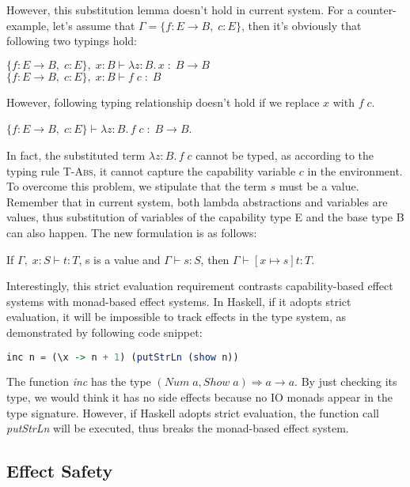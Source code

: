 However, this substitution lemma doesn't hold in current system. For a
counter-example, let's assume that $\Gamma = \{f: E \to B,\;
  c:E\}$, then it's obviously that following two typings hold:


$\{f: E \to B,\; c:E\},\; x:B \vdash \lambda z:B.\,x \; : \; B \to
  B$ \\
$\{f: E \to B,\; c:E\},\; x:B \vdash f \; c \; : \; B$

However, following typing relationship doesn't hold if we replace
$x$ with $f \; c$.

$\{f: E \to B,\; c:E\} \vdash \lambda z:B.\,f \; c \; : \; B \to B$.

In fact, the substituted term $\lambda z:B.\,f \; c$ cannot be typed,
as according to the typing rule \textsc{T-Abs}, it cannot capture the
capability variable $c$ in the environment. To overcome this problem,
we stipulate that the term $s$ must be a value. Remember that in
current system, both lambda abstractions and variables are values,
thus substitution of variables of the capability type E and the base
type B can also happen. The new formulation is as follows:

\begin{lemma}
  If $\Gamma,\; x:S \vdash t : T$, s is a value and
  $\Gamma \vdash s : S$, then $\Gamma \vdash [x \mapsto s]t : T$.
\end{lemma}

Interestingly, this strict evaluation requirement contrasts
capability-based effect systems with monad-based effect systems. In
Haskell, if it adopts strict evaluation, it will be impossible to
track effects in the type system, as demonstrated by following code
snippet:

\begin{lstlisting}[language=Haskell]
  inc n = (\x -> n + 1) (putStrLn (show n))
\end{lstlisting}

The function \emph{inc} has the type
$(Num\;a, Show\;a) \Rightarrow a \to a$. By just checking its type, we
would think it has no side effects because no IO monads appear in the
type signature. However, if Haskell adopts strict evaluation, the
function call \emph{putStrLn} will be executed, thus breaks the
monad-based effect system.

\subsection{Effect Safety}


